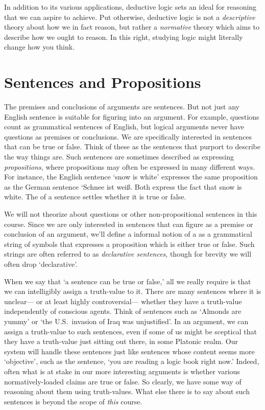 In addition to its various applications, deductive logic sets an ideal for reasoning that we can aspire to achieve.
Put otherwise, deductive logic is not a \textit{descriptive} theory about how we in fact reason, but rather a \textit{normative} theory which aims to describe how we ought to reason.
In this right, studying logic might literally change how you think.


\section{Sentences and Propositions}
\label{intro.sentences}

The premises and conclusions of arguments are sentences.
But not just any English sentence is suitable for figuring into an argument.
For example, questions count as grammatical sentences of English, but logical arguments never have questions as premises or conclusions.
We are specifically interested in sentences that can be true or false.
Think of these as the sentences that purport to describe the way things are.
Such sentences are sometimes described as expressing \emph{propositions}, where propositions may often be expressed in many different ways.
For instance, the English sentence `snow is white' expresses the same proposition as the German sentence `Schnee ist wei\ss.
Both express the fact that snow is white.
The  of a sentence settles whether it is true or false.

We will not theorize about questions or other non-propositional sentences in this course.
Since we are only interested in sentences that can figure as a premise or conclusion of an argument, we'll define a informal notion of a  as a grammatical string of symbols that expresses a proposition which is either true or false.
Such strings are often referred to as \textit{declarative sentences}, though for brevity we will often drop `declarative'.

When we say that `a sentence can be true or false,' all we really require is that we can intelligibly assign a truth-value to it.
There are many sentences where it is unclear--- or at least highly controversial--- whether they have a truth-value independently of conscious agents.
Think of sentences such as `Almonds are yummy' or `the U.S.\ invasion of Iraq was unjustified'.
In an argument, we can assign a truth-value to such sentences, even if some of us might be sceptical that they have a truth-value just sitting out there, in some Platonic realm.
Our system will handle these sentences just like sentences whose content seems more `objective', such as the sentence, `you are reading a logic book right now.'
Indeed, often what is at stake in our more interesting arguments is whether various normatively-loaded claims are true or false.
So clearly, we have some way of reasoning about them using truth-values.
What else there is to say about such sentences is beyond the scope of \textit{this} course.

